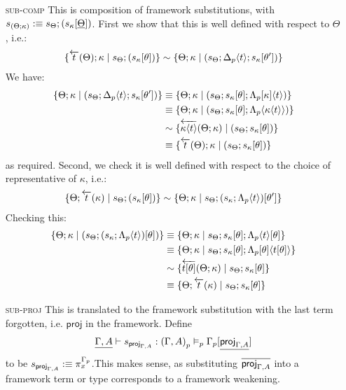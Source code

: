 \documentclass[10pt]{article}
\theoremstyle{definition}
\newcommand{\yields}{\vdash}
\newcommand{\rewrite}[2]{\overleftarrow{#1}(#2)}
\newcommand\proj[1]{\ensuremath{\mathsf{proj}_{#1}}}
\newcommand\ap[2]{\ensuremath{#1 \langle #2 \rangle }}
\begin{document}
\begin{enumerate}
\item[\textsc{sub-comp}] This is composition of framework substitutions, with $s_{(\Theta;\kappa)} :\equiv s_\Theta; (s_\kappa[\underline{\Theta}])$. 
First we show that this is well defined with respect to $\Theta$, i.e.:
\begin{align*}
\{ \rewrite{t}{\Theta};\kappa \mid s_\Theta; (s_\kappa[\theta]) \} \sim \{ \Theta;\kappa \mid (s_\Theta ; \ap{\asdep{\Delta}}{t} ; s_\kappa[\theta']) \}
\end{align*}
We have:
\begin{align*}
\{ \Theta;\kappa \mid (s_\Theta ; \ap{\asdep{\Delta}}{t} ; s_\kappa[\theta']) \}
&\equiv \{ \Theta;\kappa \mid (s_\Theta ; s_\kappa[\theta] ; \ap{\asdep{\Lambda}[\kappa]}{t}) \} \\
&\equiv \{ \Theta;\kappa \mid (s_\Theta ; s_\kappa[\theta] ; \ap{\asdep{\Lambda}}{\ap{\kappa}{t}}) \} \\
&\sim \{ \rewrite{\ap{\kappa}{t}}{\Theta;\kappa} \mid (s_\Theta ; s_\kappa[\theta]) \} \\
&\equiv \{ \rewrite{t}{\Theta};\kappa \mid (s_\Theta; s_\kappa[\theta]) \} \\
\end{align*}
as required. Second, we check it is well defined with respect to the choice of representative of $\kappa$, i.e.:
\begin{align*}
\{ \Theta;\rewrite{t}{\kappa} \mid s_\Theta; (s_\kappa[\theta]) \} \sim \{ \Theta;\kappa \mid s_\Theta ; (s_\kappa;\ap{\asdep{\Lambda}}{t})[\theta'] \}
\end{align*}
Checking this:
\begin{align*}
\{ \Theta;\kappa \mid (s_\Theta ; (s_\kappa;\ap{\asdep{\Lambda}}{t})[\theta]) \}
&\equiv \{ \Theta;\kappa \mid s_\Theta ; s_\kappa[\theta];\ap{\asdep{\Lambda}}{t}[\theta] \} \\
&\equiv \{ \Theta;\kappa \mid s_\Theta ; s_\kappa[\theta];\ap{\asdep{\Lambda}[\theta]}{t[\theta]} \} \\
&\sim \{ \rewrite{t[\theta]}{\Theta;\kappa} \mid s_\Theta ; s_\kappa[\theta] \} \\
&\equiv \{ \Theta;\rewrite{t}{\kappa} \mid s_\Theta ; s_\kappa[\theta] \}
\end{align*}

\item[\textsc{sub-proj}] This is translated to the framework substitution with the last term forgotten, i.e. $\mathsf{proj}$ in the framework. Define 
\begin{align*}
\downstairs{\Gamma, A} \yields s_{\proj{\Gamma, A}} : \asdep{(\Gamma, A)} \vDash_p \asdep{\Gamma}[\downstairs{\proj{\Gamma, A}}]
\end{align*}
to be $s_{\proj{\Gamma, A}} :\equiv \pi^{\asdep{\Gamma}}_x$.This makes sense, as substituting $\upstairs{\proj{\Gamma, A}}$ into a framework term or type corresponds to a framework weakening.


\end{enumerate}
\end{document}
